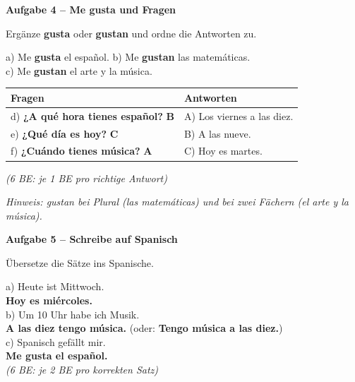 \documentclass[11pt, a4paper]{article}
\newcommand{\fachfarbe}{spanisch}
\newcommand{\punktebox}[1]{\hfill\fbox{\small \_\_\_/#1}}
\newcommand{\lsg}[1]{\textcolor{loesung}{\textbf{#1}}}
\newenvironment{aufgabe}[1]{%
    \vspace{12pt}
    \noindent\textbf{\textcolor{\fachfarbe}{Aufgabe #1}}
    \vspace{6pt}
    \begin{list}{}{\leftmargin=0pt}
    \item[]
}{%
    \end{list}
}
\newcommand{\es}[1]{\textcolor{\fachfarbe}{\textbf{#1}}}
\begin{document}
\begin{aufgabe}{4 -- Me gusta und Fragen}
Ergänze \es{gusta} oder \es{gustan} und ordne die Antworten zu. \punktebox{6}
\end{aufgabe}

\noindent
a) Me \lsg{gusta} el español. \hfill
b) Me \lsg{gustan} las matemáticas. \\[0.8em]
c) Me \lsg{gustan} el arte y la música.\\[1em]

\noindent
\begin{tabular}{|p{6.5cm}|p{5cm}|}
\hline
\textbf{Fragen} & \textbf{Antworten} \\
\hline
d) \es{¿A qué hora tienes español?} \lsg{B} & A) Los viernes a las diez. \\[0.4em]
e) \es{¿Qué día es hoy?} \lsg{C} & B) A las nueve. \\[0.4em]
f) \es{¿Cuándo tienes música?} \lsg{A} & C) Hoy es martes. \\
\hline
\end{tabular}

\textcolor{loesung}{\textit{(6 BE: je 1 BE pro richtige Antwort)}}

\textcolor{loesung}{\textit{Hinweis: gustan bei Plural (las matemáticas) und bei zwei Fächern (el arte y la música).}}

\vspace{12pt}


\begin{aufgabe}{5 -- Schreibe auf Spanisch}
Übersetze die Sätze ins Spanische. \punktebox{6}
\end{aufgabe}

\noindent
a) Heute ist Mittwoch. \\[0.5em]
\lsg{Hoy es miércoles.} \\[0.8em]

\noindent
b) Um 10 Uhr habe ich Musik. \\[0.5em]
\lsg{A las diez tengo música.} (oder: \lsg{Tengo música a las diez.}) \\[0.8em]

\noindent
c) Spanisch gefällt mir. \\[0.5em]
\lsg{Me gusta el español.} \\

\textcolor{loesung}{\textit{(6 BE: je 2 BE pro korrekten Satz)}}
\end{document}

